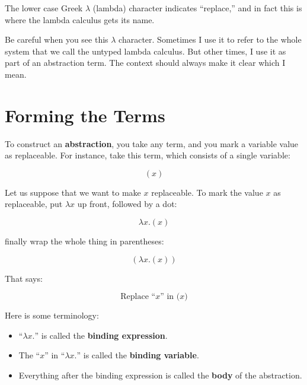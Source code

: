 \documentclass{book}
\numberwithin{equation}{chapter}
\newcommand{\vocab}{\textbf}
\begin{document}
\noindent
The lower case Greek $\lambda$ (lambda) character indicates ``replace,'' and in fact this is where the lambda calculus gets its name. 

Be careful when you see this $\lambda$ character. Sometimes I use it to refer to the whole system that we call the untyped lambda calculus. But other times, I use it as part of an abstraction term. The context should always make it clear which I mean.


\section{Forming the Terms}

To construct an \vocab{abstraction}, you take any term, and you mark a variable value as replaceable. For instance, take this term, which consists of a single variable:

\begin{equation}
(x)
\end{equation}

\noindent
Let us suppose that we want to make $x$ replaceable. To mark the value $x$ as replaceable, put $\lambda x$ up front, followed by a dot:

\begin{equation}
\lambda x.(x)
\end{equation}

\noindent
finally wrap the whole thing in parentheses:

\begin{equation}
(\lambda x.(x))
\end{equation}

\noindent
That says:

\begin{equation}
\text{Replace ``$x$'' in ($x$)}
\end{equation}

\noindent
Here is some terminology:

\begin{itemize}

\item{``$\lambda x.$'' is called the \vocab{binding expression}.}

\item{The ``$x$'' in ``$\lambda x.$'' is called the \vocab{binding variable}.}

\item{Everything after the binding expression is called the \vocab{body} of the abstraction.}

\end{itemize}
\end{document}
